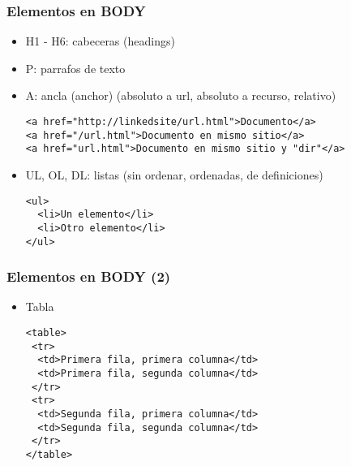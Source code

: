 
\begin{frame}[fragile]
\frametitle{Elementos en BODY}

\begin{itemize}
\item H1 - H6: cabeceras (headings)
\item P: parrafos de texto
\item A: ancla (anchor) (absoluto a url, absoluto a recurso, relativo)
\begin{verbatim}
<a href="http://linkedsite/url.html">Documento</a>
<a href="/url.html">Documento en mismo sitio</a>
<a href="url.html">Documento en mismo sitio y "dir"</a>
\end{verbatim}

\item UL, OL, DL: listas (sin ordenar, ordenadas, de definiciones)
\begin{verbatim}
<ul>
  <li>Un elemento</li>
  <li>Otro elemento</li>
</ul>
\end{verbatim}

\end{itemize}

\end{frame}


\begin{frame}[fragile]
\frametitle{Elementos en BODY (2)}

\begin{itemize}
\item Tabla
\begin{verbatim}
<table>
 <tr>
  <td>Primera fila, primera columna</td>
  <td>Primera fila, segunda columna</td>
 </tr>
 <tr>
  <td>Segunda fila, primera columna</td>
  <td>Segunda fila, segunda columna</td>
 </tr>
</table> 
\end{verbatim}

\end{itemize}

\end{frame}


